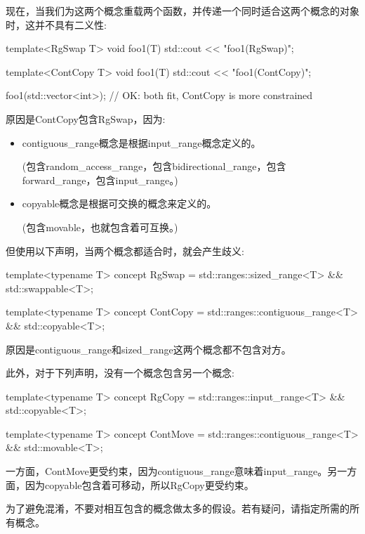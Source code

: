 现在，当我们为这两个概念重载两个函数，并传递一个同时适合这两个概念的对象时，这并不具有二义性:

\begin{cpp}
template<RgSwap T>
void foo1(T) {
	std::cout << "foo1(RgSwap)\n";
}

template<ContCopy T>
void foo1(T) {
	std::cout << "foo1(ContCopy)\n";
}

foo1(std::vector<int>{}); // OK: both fit, ContCopy is more constrained
\end{cpp}

原因是ContCopy包含RgSwap，因为:

\begin{itemize}
\item
contiguous\_range概念是根据input\_range概念定义的。

(包含random\_access\_range，包含bidirectional\_range，包含forward\_range，包含input\_range。)

\item
copyable概念是根据可交换的概念来定义的。

(包含movable，也就包含着可互换。)
\end{itemize}

但使用以下声明，当两个概念都适合时，就会产生歧义:

\begin{cpp}
template<typename T>
concept RgSwap = std::ranges::sized_range<T> && std::swappable<T>;

template<typename T>
concept ContCopy = std::ranges::contiguous_range<T> && std::copyable<T>;
\end{cpp}

原因是contiguous\_range和sized\_range这两个概念都不包含对方。

此外，对于下列声明，没有一个概念包含另一个概念:

\begin{cpp}
template<typename T>
concept RgCopy = std::ranges::input_range<T> && std::copyable<T>;

template<typename T>
concept ContMove = std::ranges::contiguous_range<T> && std::movable<T>;
\end{cpp}

一方面，ContMove更受约束，因为contiguous\_range意味着input\_range。另一方面，因为copyable包含着可移动，所以RgCopy更受约束。

为了避免混淆，不要对相互包含的概念做太多的假设。若有疑问，请指定所需的所有概念。


